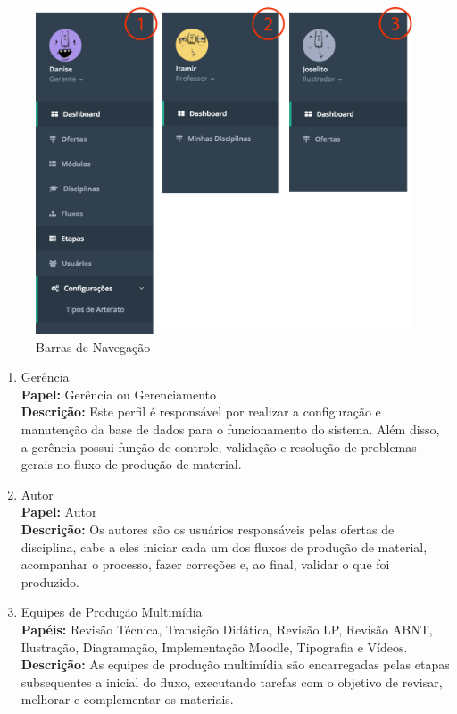 \begin{figure}[H]
\centering
     \includegraphics[width=1.0\textwidth]{Screens/Menu.png}
      \caption{Barras de Navegação}
       \label{fig:sc_nav_bar}
\end{figure}

\begin{enumerate}  
\item Gerência \\
	\textbf{Papel:} Gerência ou Gerenciamento \\
	\textbf{Descrição:} Este perfil é responsável por realizar a configuração e manutenção da base de dados para o funcionamento do sistema. Além disso, a gerência possui função de controle, validação e resolução de problemas gerais no fluxo de produção de material.
\item Autor \\
	\textbf{Papel:} Autor \\
	\textbf{Descrição:} Os autores são os usuários responsáveis pelas ofertas de disciplina, cabe a eles iniciar cada um dos fluxos de produção de  material, acompanhar o processo, fazer correções e, ao final, validar o que foi produzido.
\item Equipes de Produção Multimídia \\
	\textbf{Papéis:} Revisão Técnica, Transição Didática, Revisão LP, Revisão ABNT, Ilustração, Diagramação, Implementação Moodle, Tipografia e Vídeos. \\
	\textbf{Descrição:} As equipes de produção multimídia são encarregadas pelas etapas subsequentes a inicial do fluxo, executando tarefas com o objetivo de revisar, melhorar e complementar os materiais.
\end{enumerate}

